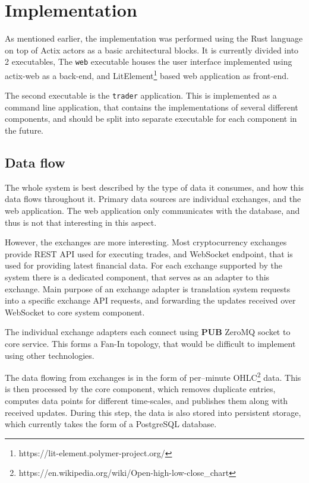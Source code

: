 \documentclass{ExcelAtFIT}
\begin{document}
    \section{Implementation}
    As mentioned earlier, the implementation was performed using the Rust language on top of Actix actors as a basic architectural blocks.
    It is currently divided into 2 executables, The \verb|web| executable houses the user interface implemented using actix-web as a back-end,
    and LitElement\footnote{https://lit-element.polymer-project.org/} based web application as front-end.

    The second executable is the \verb|trader| application. This is implemented as a command line application, that contains the
    implementations of several different components, and should be split into separate executable for each component in the future.

    \subsection{Data flow}
    The whole system is best described by the type of data it consumes, and how this data flows throughout it. Primary data sources
    are individual exchanges, and the web application. The web application only communicates with the database, and thus is not that
    interesting in this aspect.

    However, the exchanges are more interesting. Most cryptocurrency exchanges provide REST API used for executing trades,
    and WebSocket endpoint, that is used for providing latest financial data.
    For each exchange supported by the system there is a dedicated component, that serves as an adapter to this exchange.
    Main purpose of an exchange adapter is translation system requests into a specific exchange API requests, and forwarding the updates received over WebSocket to core
    system component.

    The individual exchange adapters each connect using \textbf{PUB} ZeroMQ socket to core service.
    This forms a Fan-In topology, that would be difficult to implement using other technologies.

    The data flowing from exchanges is in the form of per--minute OHLC\footnote{https://en.wikipedia.org/wiki/Open-high-low-close\_chart} data.
    This is then processed by the core component, which removes duplicate entries, computes data points for different time-scales,
    and publishes them along with received updates.
    During this step, the data is also stored into persistent storage, which currently takes the form of a PostgreSQL database.
\end{document}
